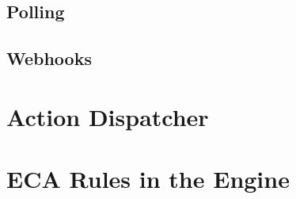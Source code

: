 
%






\subsection{Polling}


\subsection{Webhooks}







\section{Action Dispatcher}



\section{ECA Rules in the Engine}

